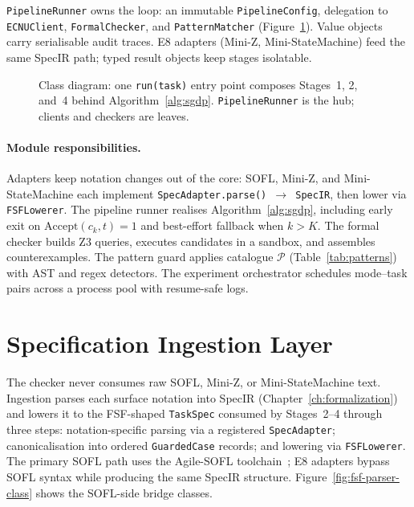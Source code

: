 \texttt{PipelineRunner} owns the loop: an immutable \texttt{PipelineConfig},
delegation to \texttt{ECNUClient}, \texttt{FormalChecker}, and
\texttt{PatternMatcher} (Figure~\ref{fig:system-class}).
Value objects carry serialisable audit traces.
E8 adapters (Mini-Z, Mini-StateMachine) feed the same SpecIR path; typed
result objects keep stages isolatable.

\begin{figure}[t]
  \centering
  \caption{Class diagram: one \texttt{run(task)} entry point composes
    Stages~1, 2, and~4 behind Algorithm~\ref{alg:sgdp}.
    \texttt{PipelineRunner} is the hub; clients and checkers are leaves.}
  \label{fig:system-class}
\end{figure}

\paragraph{Module responsibilities.}
Adapters keep notation changes out of the core: SOFL, Mini-Z, and
Mini-StateMachine each implement \texttt{SpecAdapter.parse() $\to$ SpecIR},
then lower via \texttt{FSFLowerer}.
The pipeline runner realises Algorithm~\ref{alg:sgdp}, including early exit on
$\mathrm{Accept}(c_k,t)=1$ and best-effort fallback when $k > K$.
The formal checker builds Z3 queries, executes candidates in a sandbox, and
assembles counterexamples.
The pattern guard applies catalogue $\mathcal{P}$ (Table~\ref{tab:patterns})
with AST and regex detectors.
The experiment orchestrator schedules mode--task pairs across a process pool
with resume-safe logs.

\section{Specification Ingestion Layer}
\label{sec:impl:ingestion}

The checker never consumes raw SOFL, Mini-Z, or Mini-StateMachine text.
Ingestion parses each surface notation into SpecIR
(Chapter~\ref{ch:formalization}) and lowers it to the FSF-shaped
\texttt{TaskSpec} consumed by Stages~2--4 through three steps:
notation-specific parsing via a registered \texttt{SpecAdapter};
canonicalisation into ordered \texttt{GuardedCase} records; and lowering via
\texttt{FSFLowerer}.
The primary SOFL path uses the Agile-SOFL
toolchain~\citep{li2022qrs_companion,liu2004soflbook}; E8 adapters bypass SOFL
syntax while producing the same SpecIR structure.
Figure~\ref{fig:fsf-parser-class} shows the SOFL-side bridge classes.

